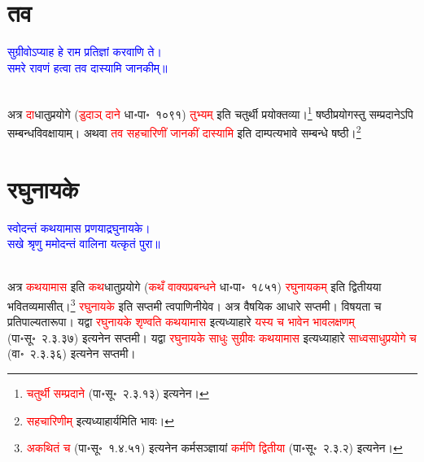 \section[तव]{तव}
\centering\textcolor{blue}{सुग्रीवोऽप्याह हे राम प्रतिज्ञां करवाणि ते।\nopagebreak\\
समरे रावणं हत्वा तव दास्यामि जानकीम्॥}\nopagebreak\\
\\
\begin{sloppypar}\justifying\noindent\hspace{10mm} अत्र \textcolor{red}{दा}\-धातु\-प्रयोगे (\textcolor{red}{डुदाञ् दाने} धा॰पा॰~१०९१) \textcolor{red}{तुभ्यम्‌} इति चतुर्थी प्रयोक्तव्या।\footnote{\textcolor{red}{चतुर्थी सम्प्रदाने} (पा॰सू॰~२.३.१३) इत्यनेन।} षष्ठी\-प्रयोगस्तु सम्प्रदानेऽपि सम्बन्ध\-विवक्षायाम्। अथवा \textcolor{red}{तव सहचारिणीं जानकीं दास्यामि} इति दाम्पत्य\-भावे सम्बन्धे षष्ठी।\footnote{\textcolor{red}{सहचारिणीम्} इत्यध्याहार्यमिति भावः।}\end{sloppypar}
\section[रघुनायके]{रघुनायके}
\centering\textcolor{blue}{स्वोदन्तं कथयामास प्रणयाद्रघुनायके।\nopagebreak\\
सखे श्रृणु ममोदन्तं वालिना यत्कृतं पुरा॥}\nopagebreak\\
\\
\begin{sloppypar}\justifying\noindent\hspace{10mm} अत्र \textcolor{red}{कथयामास} इति \textcolor{red}{कथ}\-धातु\-प्रयोगे (\textcolor{red}{कथँ वाक्य\-प्रबन्धने} धा॰पा॰~१८५१) \textcolor{red}{रघुनायकम्‌} इति द्वितीयया भवितव्यमासीत्।\footnote{\textcolor{red}{अकथितं च} (पा॰सू॰~१.४.५१) इत्यनेन कर्म\-सञ्ज्ञायां \textcolor{red}{कर्मणि द्वितीया} (पा॰सू॰~२.३.२) इत्यनेन।} \textcolor{red}{रघुनायके} इति सप्तमी त्वपाणिनीयेव। अत्र वैषयिक आधारे सप्तमी। विषयता च प्रतिपाल्यता\-रूपा। यद्वा \textcolor{red}{रघुनायके शृण्वति कथयामास} इत्यध्याहारे \textcolor{red}{यस्य च भावेन भाव\-लक्षणम्‌} (पा॰सू॰~२.३.३७) इत्यनेन सप्तमी। यद्वा \textcolor{red}{रघुनायके साधुः सुग्रीवः कथयामास} इत्यध्याहारे \textcolor{red}{साध्व\-साधु\-प्रयोगे च} (वा॰~२.३.३६) इत्यनेन सप्तमी।\end{sloppypar}
